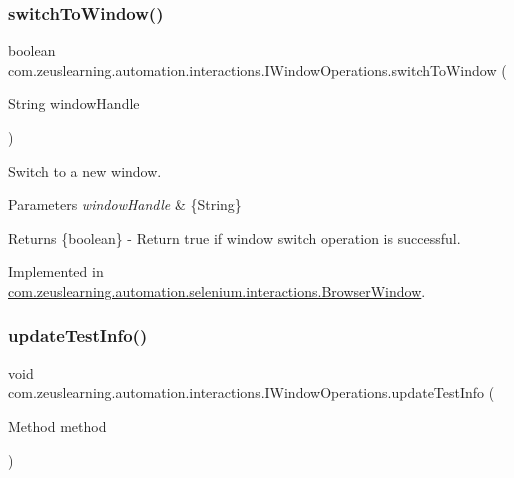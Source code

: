 \subsubsection{\texorpdfstring{switch\+To\+Window()}{switchToWindow()}}
{\footnotesize\ttfamily boolean com.\+zeuslearning.\+automation.\+interactions.\+I\+Window\+Operations.\+switch\+To\+Window (\begin{DoxyParamCaption}\item[{String}]{window\+Handle }\end{DoxyParamCaption})}

Switch to a new window.


\begin{DoxyParams}{Parameters}
{\em window\+Handle} & \{String\} \\
\hline
\end{DoxyParams}
\begin{DoxyReturn}{Returns}
\{boolean\} -\/ Return {\ttfamily true} if window switch operation is successful. 
\end{DoxyReturn}


Implemented in \hyperlink{classcom_1_1zeuslearning_1_1automation_1_1selenium_1_1interactions_1_1BrowserWindow_aed6af64be64fb3d9db28ace2a33f2017}{com.\+zeuslearning.\+automation.\+selenium.\+interactions.\+Browser\+Window}.

\hypertarget{interfacecom_1_1zeuslearning_1_1automation_1_1interactions_1_1IWindowOperations_a8415fde5770dfadfed5b07f514251e2c}{}\label{interfacecom_1_1zeuslearning_1_1automation_1_1interactions_1_1IWindowOperations_a8415fde5770dfadfed5b07f514251e2c} 
\subsubsection{\texorpdfstring{update\+Test\+Info()}{updateTestInfo()}\hspace{0.1cm}{\footnotesize\ttfamily [1/2]}}
{\footnotesize\ttfamily void com.\+zeuslearning.\+automation.\+interactions.\+I\+Window\+Operations.\+update\+Test\+Info (\begin{DoxyParamCaption}\item[{Method}]{method }\end{DoxyParamCaption})}

